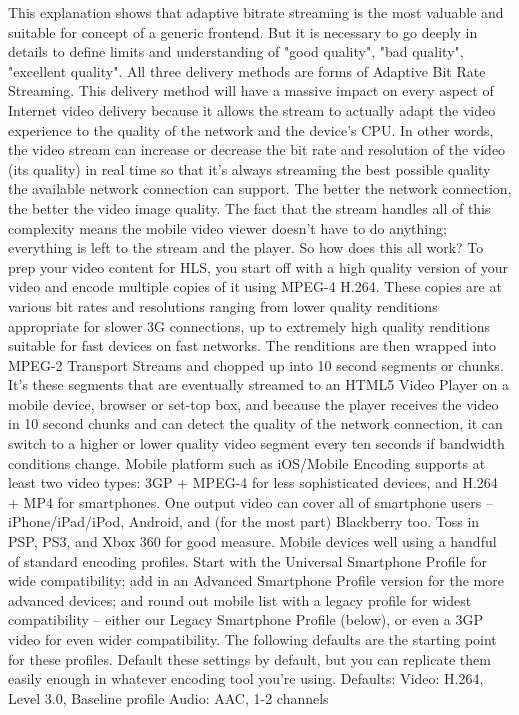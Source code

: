   \newline
  This explanation shows that adaptive bitrate streaming is the most valuable and suitable for concept of a generic frontend.
  But it is necessary to go deeply in details to define limits and understanding of "good quality", "bad quality", "excellent quality".
  All three delivery methods are forms of Adaptive Bit Rate Streaming. This delivery method will have a massive impact on every aspect of Internet video delivery because it allows the stream to actually adapt the video experience to the quality of the network and the device's CPU.
  \newline
  In other words, the video stream can increase or decrease the bit rate and resolution of the video (its quality) in real time so that it’s always streaming the best possible quality the available network connection can support. The better the network connection, the better the video image quality. The fact that the stream handles all of this complexity means the mobile video viewer doesn’t have to do anything; everything is left to the stream and the player.
  \newline
  So how does this all work? To prep your video content for HLS, you start off with a high quality version of your video and encode multiple copies of it using MPEG-4 H.264. These copies are at various bit rates and resolutions ranging from lower quality renditions appropriate for slower 3G connections, up to extremely high quality renditions suitable for fast devices on fast networks. The renditions are then wrapped into MPEG-2 Transport Streams and chopped up into 10 second segments or chunks. It’s these segments that are eventually streamed to an HTML5 Video Player on a mobile device, browser or set-top box, and because the player receives the video in 10 second chunks and can detect the quality of the network connection, it can switch to a higher or lower quality video segment every ten seconds if bandwidth conditions change.
  \newline
  Mobile platform such as iOS/Mobile Encoding supports at least two video types: 3GP + MPEG-4 for less sophisticated devices, and H.264 + MP4 for smartphones. One output video can cover all of smartphone users – iPhone/iPad/iPod, Android, and (for the most part) Blackberry too. Toss in PSP, PS3, and Xbox 360 for good measure. Mobile devices well using a handful of standard encoding profiles. Start with the Universal Smartphone Profile for wide compatibility; add in an Advanced Smartphone Profile version for the more advanced devices; and round out mobile list with a legacy profile for widest compatibility – either our Legacy Smartphone Profile (below), or even a 3GP video for even wider compatibility. The following defaults are the starting point for these profiles. Default these settings by default, but you can replicate them easily enough in whatever encoding tool you're using. Defaults: Video: H.264, Level 3.0, Baseline profile Audio: AAC, 1-2 channels


